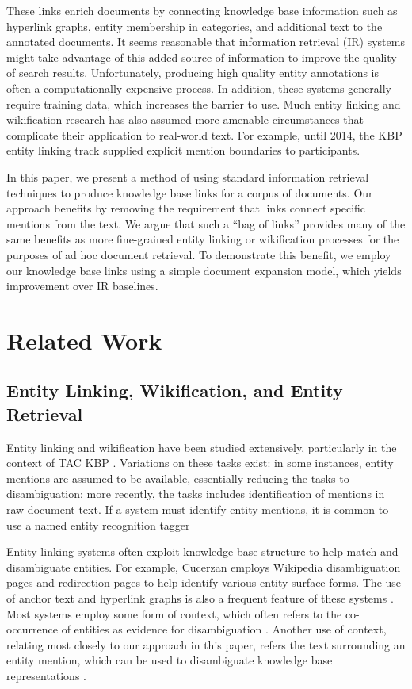 \documentclass{sig-alternate}
\begin{document}
These links enrich documents by connecting knowledge base information such as hyperlink graphs, entity membership in categories, and additional text to the annotated documents. It seems reasonable that information retrieval (IR) systems might take advantage of this added source of information to improve the quality of search results. Unfortunately, producing high quality entity annotations is often a computationally expensive process. In addition, these systems generally require training data, which increases the barrier to use. Much entity linking and wikification research has also assumed more amenable circumstances that complicate their application to real-world text. For example, until 2014, the KBP entity linking track supplied explicit mention boundaries to participants.

In this paper, we present a method of using standard information retrieval techniques to produce knowledge base links for a corpus of documents. Our approach benefits by removing the requirement that links connect specific mentions from the text. We argue that such a ``bag of links'' provides many of the same benefits as more fine-grained entity linking or wikification processes for the purposes of ad hoc document retrieval. To demonstrate this benefit, we employ our knowledge base links using a simple document expansion model, which yields improvement over IR baselines.

\section{Related Work}\label{section.related}

\subsection{Entity Linking, Wikification, and Entity Retrieval}\label{section.related.entities}

Entity linking and wikification have been studied extensively, particularly in the context of TAC KBP \cite{Ji2014}. Variations on these tasks exist: in some instances, entity mentions are assumed to be available, essentially reducing the tasks to disambiguation; more recently, the tasks includes identification of mentions in raw document text. If a system must identify entity mentions, it is common to use a named entity recognition tagger \cite{Hoffart2011, Ratinov2011}

Entity linking systems often exploit knowledge base structure to help match and disambiguate entities. For example, Cucerzan \cite{Cucerzan2007} employs Wikipedia disambiguation pages and redirection pages to help identify various entity surface forms. The use of anchor text and hyperlink graphs is also a frequent feature of these systems \cite{Mihalcea2007, Ratinov2011, Stoyanov2012}. Most systems employ some form of context, which often refers to the co-occurrence of entities as evidence for disambiguation \cite{Stoyanov2012, Dalton2013}. Another use of context, relating most closely to our approach in this paper, refers the text surrounding an entity mention, which can be used to disambiguate knowledge base representations \cite{Mihalcea2007, Dalton2013}.
\end{document}
